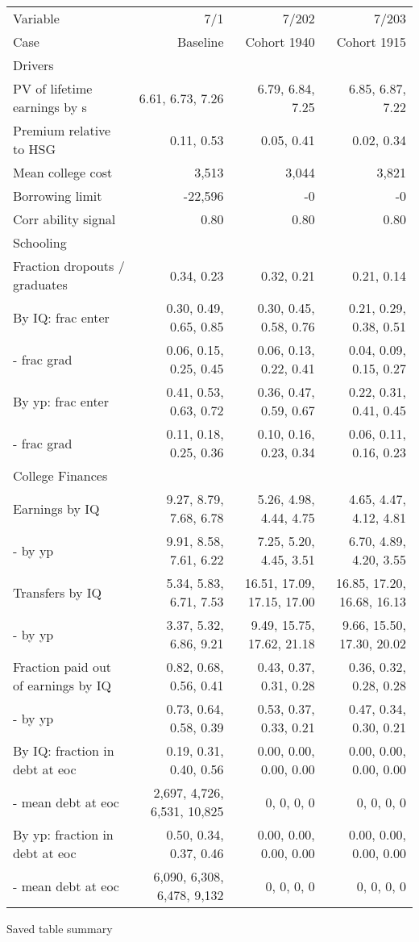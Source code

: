 \begin{tabular}{lrrr}
\hline
Variable & 7/1  & 7/202  & 7/203  \\ 
Case & Baseline  & Cohort 1940  & Cohort 1915  \\ 
Drivers &   &   &   \\ 
PV of lifetime earnings by s & 6.61, 6.73, 7.26  & 6.79, 6.84, 7.25  & 6.85, 6.87, 7.22  \\ 
Premium relative to HSG & 0.11, 0.53  & 0.05, 0.41  & 0.02, 0.34  \\ 
Mean college cost & 3,513  & 3,044  & 3,821  \\ 
Borrowing limit & -22,596  & -0  & -0  \\ 
Corr ability signal & 0.80  & 0.80  & 0.80  \\ 
\hline
Schooling &   &   &   \\ 
Fraction dropouts / graduates & 0.34, 0.23  & 0.32, 0.21  & 0.21, 0.14  \\ 
By IQ: frac enter & 0.30, 0.49, 0.65, 0.85  & 0.30, 0.45, 0.58, 0.76  & 0.21, 0.29, 0.38, 0.51  \\ 
- frac grad & 0.06, 0.15, 0.25, 0.45  & 0.06, 0.13, 0.22, 0.41  & 0.04, 0.09, 0.15, 0.27  \\ 
By yp: frac enter & 0.41, 0.53, 0.63, 0.72  & 0.36, 0.47, 0.59, 0.67  & 0.22, 0.31, 0.41, 0.45  \\ 
- frac grad & 0.11, 0.18, 0.25, 0.36  & 0.10, 0.16, 0.23, 0.34  & 0.06, 0.11, 0.16, 0.23  \\ 
\hline
College Finances &   &   &   \\ 
Earnings by IQ & 9.27, 8.79, 7.68, 6.78  & 5.26, 4.98, 4.44, 4.75  & 4.65, 4.47, 4.12, 4.81  \\ 
- by yp & 9.91, 8.58, 7.61, 6.22  & 7.25, 5.20, 4.45, 3.51  & 6.70, 4.89, 4.20, 3.55  \\ 
Transfers by IQ & 5.34, 5.83, 6.71, 7.53  & 16.51, 17.09, 17.15, 17.00  & 16.85, 17.20, 16.68, 16.13  \\ 
- by yp & 3.37, 5.32, 6.86, 9.21  & 9.49, 15.75, 17.62, 21.18  & 9.66, 15.50, 17.30, 20.02  \\ 
Fraction paid out of earnings by IQ & 0.82, 0.68, 0.56, 0.41  & 0.43, 0.37, 0.31, 0.28  & 0.36, 0.32, 0.28, 0.28  \\ 
- by yp & 0.73, 0.64, 0.58, 0.39  & 0.53, 0.37, 0.33, 0.21  & 0.47, 0.34, 0.30, 0.21  \\ 
By IQ: fraction in debt at eoc & 0.19, 0.31, 0.40, 0.56  & 0.00, 0.00, 0.00, 0.00  & 0.00, 0.00, 0.00, 0.00  \\ 
- mean debt at eoc & 2,697, 4,726, 6,531, 10,825  & 0, 0, 0, 0  & 0, 0, 0, 0  \\ 
By yp: fraction in debt at eoc & 0.50, 0.34, 0.37, 0.46  & 0.00, 0.00, 0.00, 0.00  & 0.00, 0.00, 0.00, 0.00  \\ 
- mean debt at eoc & 6,090, 6,308, 6,478, 9,132  & 0, 0, 0, 0  & 0, 0, 0, 0  \\ 
\hline
\end{tabular}%
Saved table summary

